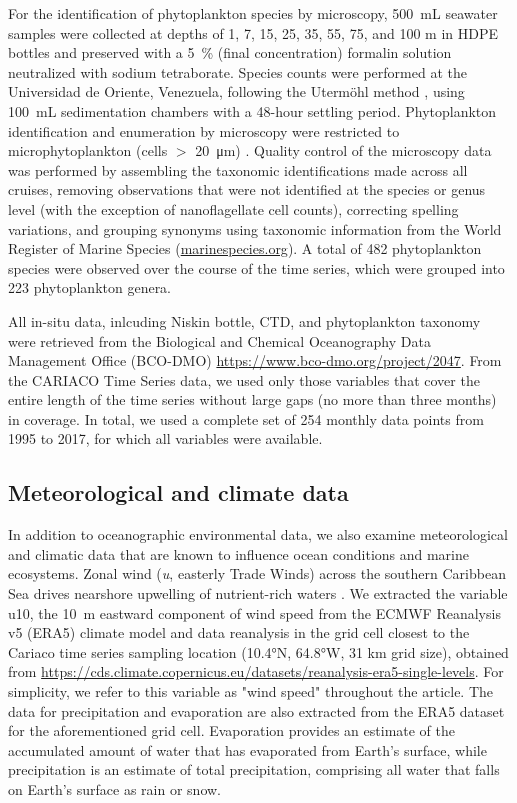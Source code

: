 \documentclass[draft]{agujournal2019}
\begin{document}
    For the identification of phytoplankton species by microscopy, \qty{500}{\milli\liter} seawater samples were collected at depths of 1, 7, 15, 25, 35, 55, 75, and 100 m in HDPE bottles and preserved with a \qty{5}{\%} (final concentration) formalin solution neutralized with sodium tetraborate. Species counts were performed at the Universidad de Oriente, Venezuela, following the Utermöhl method \cite{hasle1978inverted}, using \qty{100}{\milli\liter} sedimentation chambers with a 48-hour settling period. Phytoplankton identification and enumeration by microscopy were restricted to microphytoplankton (cells $>$ \qty{20}{\micro \meter}) \cite{mutshinda_environmental_2013}.
    Quality control of the microscopy data was performed by assembling the taxonomic identifications made across all cruises, removing observations that were not identified at the species or genus level (with the exception of nanoflagellate cell counts), correcting spelling variations, and grouping synonyms using taxonomic information from the World Register of Marine Species (\url{marinespecies.org}). A total of 482 phytoplankton species were observed over the course of the time series, which were grouped into 223 phytoplankton genera.

    
    All in-situ data, inlcuding Niskin bottle, CTD, and phytoplankton taxonomy were retrieved from the Biological and Chemical Oceanography Data Management Office (BCO-DMO) \url{https://www.bco-dmo.org/project/2047}. 
    From the CARIACO Time Series data, we used only those variables that cover the entire length of the time series without large gaps (no more than three months) in coverage. In total, we used a complete set of 254 monthly data points from 1995 to 2017, for which all variables were available.


\subsection{Meteorological and climate data}
    In addition to oceanographic environmental data, we also examine meteorological and climatic data that are known to influence ocean conditions and marine ecosystems. Zonal wind (\textit{u}, easterly Trade Winds) across the southern Caribbean Sea drives nearshore upwelling of nutrient-rich waters \cite{rueda-roa_southern_2013}. We extracted the variable u10, the \qty{10}{\meter} eastward component of wind speed from the ECMWF Reanalysis v5 (ERA5) climate model and data reanalysis in the grid cell closest to the Cariaco time series sampling location (\ang{10.4}N, \ang{64.8}W, 31 km grid size), obtained from \url{https://cds.climate.copernicus.eu/datasets/reanalysis-era5-single-levels}. For simplicity, we refer to this variable as "wind speed" throughout the article. The data for precipitation and evaporation are also extracted from the ERA5 dataset for the aforementioned grid cell. Evaporation provides an estimate of the accumulated amount of water that has evaporated from Earth's surface, while precipitation is an estimate of total precipitation, comprising all water that falls on Earth's surface as rain or snow. 
    
\end{document}
